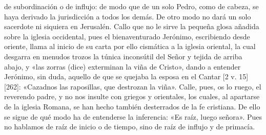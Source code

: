 de subordinación o de influjo: de modo que de un solo Pedro, como de cabeza, se haya derivado la jurisdicción a todos los demás. De otro modo no dará un solo sacerdote ni siquiera en Jerusalén. Callo que no le sirve la pequeña glosa añadida sobre la iglesia occidental, pues el bienaventurado Jerónimo, escribiendo desde oriente, llama al inicio de su carta por ello cismática a la iglesia oriental, la cual desgarra en menudos trozos la túnica inconsútil del Señor y tejida de arriba abajo, y «las zorras (dice) exterminan la viña de Cristo», dando a entender Jerónimo, sin duda, aquello de que se quejaba la esposa en el Cantar [2 v. 15] [262]: «Cazadnos las raposillas, que destrozan la viña». Calle, pues, os lo ruego, el reverendo padre, y no nos insulte con griegos y orientales, los cuales, al apartarse de la iglesia Romana, se han hecho también desterrados de la fe cristiana. De ello se sigue de qué modo ha de entenderse la inferencia: «Es raíz, luego señora». Pues no hablamos de raíz de inicio o de tiempo, sino de raíz de influjo y de primacía.

